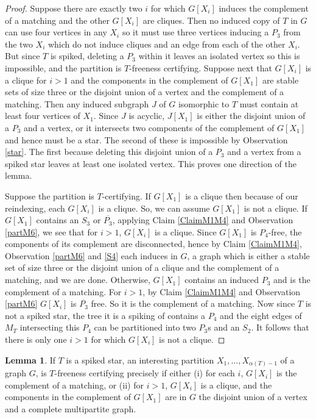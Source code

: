 \documentclass[12pt]{article}
\theoremstyle{definition}
\newtheorem{lemma}[theorem]{Lemma}
\begin{document}
\begin{proof} 
Suppose there are exactly two $i$ for which  $G[X_i]$  induces the complement of a matching and the other $G[X_i]$ are cliques.
Then no induced copy of $T$ in $G$ can use four vertices in any $X_i$ so it must use three vertices  inducing a $P_3$ from the two $X_i$
which do not induce cliques and an edge  from each of the other $X_i$.  But since $T$ is spiked, deleting a $P_3$ within it leaves an isolated vertex so this is 
impossible, and the partition is $T$-freeness certifying. 
Suppose  next that $G[X_i]$ is a clique for $i>1$ and the components in the complement of   $G[X_1]$ are stable sets of size three or the disjoint 
union of a vertex and the complement of a matching. Then any induced subgraph $J$  of $G$
isomorphic to $T$ must contain  at least four vertices of $X_1$. Since $J$ is acyclic, $J[X_1]$ is either the 
disjoint union of a $P_3$ and a vertex,   or  it  intersects two components 
of the complement of $G[X_1]$  and hence  must be a star. The second  of these  is  impossible by Observation \ref{star}. The 
first because deleting this disjoint union of a $P_3$ and a vertex from a spiked star leaves at least one isolated vertex.
This proves one direction of the lemma. 


Suppose the partition is  $T$-certifying. 
If $G[X_1]$ is a clique then because of our reindexing, each $G[X_i]$ is a clique. 
So, we can assume $G[X_1]$ is not a clique. 
If  $G[X_1]$ contains  an $S_3$ or $\overline{P_3}$, 
applying Claim \ref{ClaimM1M4} and Observation \ref{partM6},  we see that for $i>1$, $G[X_i]$ is a clique. 
Since $G[X_1]$ is $P_4$-free, the components of its complement are disconnected, hence by Claim \ref{ClaimM1M4}, Observation \ref{partM6} and \ref{S4} each induces in $G$, a graph which is either a stable set of size three or the disjoint union
of a clique and  the complement of a matching, and we are done. Otherwise, $G[X_1]$ contains an induced $P_3$ and
 is the complement of a matching.  For $i>1$, by Claim \ref{ClaimM1M4} and Observation \ref{partM6} $G[X_i]$ is $\overline{P_3}$ free. So it is the complement of a matching. 
Now since $T$ is not a spiked star, the tree it is a spiking of contains a $P_4$ and the eight edges of $M_T$ intersecting this $P_4$ can be 
partitioned into two $P_3$s and an $S_2$. It follows that there is only one $i>1$ for which $G[X_i]$ is not a clique. 
\end{proof}


\begin{lemma} \label{spikeds}
 If $T$ is a  spiked star, an interesting  partition $X_1,...,X_{\alpha(T)-1}$  of a graph $G$, is $T$-freeness certifying 
precisely if   either  (i) for each $i$, $G[X_i]$ is the complement of a matching,  or (ii) for $i>1$, $G[X_i]$ is a clique, and the components in the 
complement of $G[X_1]$  are in $G$  the disjoint union of a vertex and a complete multipartite graph.
\end{lemma}
\end{document}
